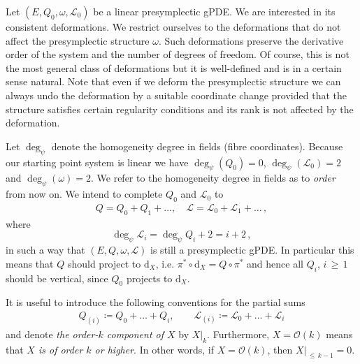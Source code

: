 \documentclass[a4paper,12pt]{article}
\numberwithin{equation}{section} %
\newcommand{\dx}{\mathrm{d}_X}
\renewcommand{\geq}{\,{\geqslant}\,}
\renewcommand{\leq}{\,{\leqslant}\,}
\def\cL{\mathcal{L}}
\newcommand{\h}{\cL}
\newcommand{\order}[1]{\mathcal{O}(#1)}
\begin{document}
Let $(E,Q_0,\omega,\h_0)$ be a linear presymplectic gPDE. We are interested in its consistent deformations. We restrict ourselves to the deformations that do not affect the presymplectic structure $\omega$. Such deformations preserve the derivative order of the system and the number of degrees of freedom. Of course, this is not the most general class of deformations but it is well-defined and is in a certain sense natural. Note that even if we deform the presymplectic structure we can always undo the deformation by a suitable coordinate change provided that the structure satisfies certain regularity conditions and its rank is not affected by the deformation.

Let $\deg_\psi$ denote the homogeneity degree in fields (fibre coordinates).
Because our starting point system is linear we have $\deg_\psi (Q_0) = 0$, $\deg_\psi (\h_0) = 2$ and $\deg_\psi(\omega) = 2$. We refer to the homogeneity degree in fields as to \textit{order} from now on. We intend to complete $Q_0$ and $\h_0$ to
\begin{align}
	Q = Q_0 + Q_1 + \dots,\quad \h = \h_0 + \h_1 + \dots\,,
\end{align}
where
\begin{equation}
    \deg_\psi \h_i = \deg_\psi Q_i + 2 = i + 2\,,
\end{equation}
in such a way that $(E,Q,\omega,\cL)$ is still a presymplectic gPDE. In particular this means that $Q$ should project to $\dx$, i.e. $\pi^*\circ \dx = Q\circ \pi^*$ and hence all $Q_{i}$, $i \geq 1$ should be vertical, since $Q_0$ projects to $\dx$. 


It is useful to introduce the following conventions for the partial sums
\begin{align}
	Q_{(i)} \coloneqq Q_0 + \dots + Q_i, \qquad \h_{(i)} \coloneqq \h_0 + \dots + \h_i
\end{align}
and denote \textit{the order-$k$ component of $X$} by $\left.X\right|_k$. Furthermore,   $X = \order{k}$ means that \textit{$X$ is of order $k$ or higher}. In other words, if $X=\order{k}$, then $X|_{\leq k-1} = 0$. 
\end{document}
